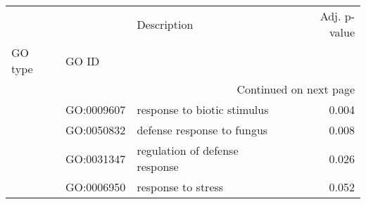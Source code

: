 \begin{longtable}{lllr}
\toprule
   &            &                     Description &  Adj. p-value \\
GO type & GO ID &                                 &               \\
\midrule
\endhead
\midrule
\multicolumn{4}{r}{{Continued on next page}} \\
\midrule
\endfoot

\bottomrule
\endlastfoot
\multirow{4}{*}{BP} & GO:0009607 &     response to biotic stimulus &         0.004 \\
   & GO:0050832 &      defense response to fungus &         0.008 \\
   & GO:0031347 &  regulation of defense response &         0.026 \\
   & GO:0006950 &              response to stress &         0.052 \\
\end{longtable}
